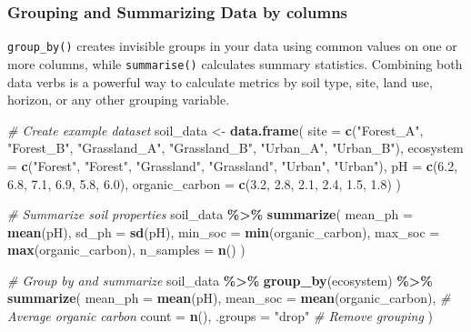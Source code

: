 \documentclass[
  10pt,
  b5paper,
  oneside]{book}
\newenvironment{Shaded}{\begin{snugshade}}{\end{snugshade}}
\newcommand{\AttributeTok}[1]{\textcolor[rgb]{0.13,0.29,0.53}{#1}}
\newcommand{\CommentTok}[1]{\textcolor[rgb]{0.56,0.35,0.01}{\textit{#1}}}
\newcommand{\FloatTok}[1]{\textcolor[rgb]{0.00,0.00,0.81}{#1}}
\newcommand{\FunctionTok}[1]{\textcolor[rgb]{0.13,0.29,0.53}{\textbf{#1}}}
\newcommand{\NormalTok}[1]{#1}
\newcommand{\OtherTok}[1]{\textcolor[rgb]{0.56,0.35,0.01}{#1}}
\newcommand{\SpecialCharTok}[1]{\textcolor[rgb]{0.81,0.36,0.00}{\textbf{#1}}}
\newcommand{\StringTok}[1]{\textcolor[rgb]{0.31,0.60,0.02}{#1}}
\begin{document}
\subsubsection{Grouping and Summarizing Data by columns}\label{dplyr-group}

\texttt{group\_by()} creates invisible groups in your data using common values on one or more columns, while \texttt{summarise()} calculates summary statistics.
Combining both data verbs is a powerful way to calculate metrics by soil type, site, land use, horizon, or any other grouping variable.

\begin{Shaded}
\begin{Highlighting}[]
\CommentTok{\# Create example dataset}
\NormalTok{soil\_data }\OtherTok{\textless{}{-}} \FunctionTok{data.frame}\NormalTok{(}
\AttributeTok{site =} \FunctionTok{c}\NormalTok{(}\StringTok{"Forest\_A"}\NormalTok{, }\StringTok{"Forest\_B"}\NormalTok{, }\StringTok{"Grassland\_A"}\NormalTok{, }\StringTok{"Grassland\_B"}\NormalTok{, }\StringTok{"Urban\_A"}\NormalTok{, }\StringTok{"Urban\_B"}\NormalTok{),}
\AttributeTok{ecosystem =} \FunctionTok{c}\NormalTok{(}\StringTok{"Forest"}\NormalTok{, }\StringTok{"Forest"}\NormalTok{, }\StringTok{"Grassland"}\NormalTok{, }\StringTok{"Grassland"}\NormalTok{, }\StringTok{"Urban"}\NormalTok{, }\StringTok{"Urban"}\NormalTok{),}
\AttributeTok{pH =} \FunctionTok{c}\NormalTok{(}\FloatTok{6.2}\NormalTok{, }\FloatTok{6.8}\NormalTok{, }\FloatTok{7.1}\NormalTok{, }\FloatTok{6.9}\NormalTok{, }\FloatTok{5.8}\NormalTok{, }\FloatTok{6.0}\NormalTok{),}
\AttributeTok{organic\_carbon =} \FunctionTok{c}\NormalTok{(}\FloatTok{3.2}\NormalTok{, }\FloatTok{2.8}\NormalTok{, }\FloatTok{2.1}\NormalTok{, }\FloatTok{2.4}\NormalTok{, }\FloatTok{1.5}\NormalTok{, }\FloatTok{1.8}\NormalTok{)}
\NormalTok{)}

\CommentTok{\# Summarize soil properties}
\NormalTok{soil\_data }\SpecialCharTok{\%\textgreater{}\%}
  \FunctionTok{summarize}\NormalTok{(}
    \AttributeTok{mean\_ph =} \FunctionTok{mean}\NormalTok{(pH),}
    \AttributeTok{sd\_ph =} \FunctionTok{sd}\NormalTok{(pH),}
    \AttributeTok{min\_soc =} \FunctionTok{min}\NormalTok{(organic\_carbon),}
    \AttributeTok{max\_soc =} \FunctionTok{max}\NormalTok{(organic\_carbon),}
    \AttributeTok{n\_samples =} \FunctionTok{n}\NormalTok{()}
\NormalTok{  )}

\CommentTok{\# Group by and summarize}
\NormalTok{soil\_data }\SpecialCharTok{\%\textgreater{}\%}
  \FunctionTok{group\_by}\NormalTok{(ecosystem) }\SpecialCharTok{\%\textgreater{}\%}
  \FunctionTok{summarize}\NormalTok{(}
    \AttributeTok{mean\_ph =} \FunctionTok{mean}\NormalTok{(pH),}
    \AttributeTok{mean\_soc =} \FunctionTok{mean}\NormalTok{(organic\_carbon), }\CommentTok{\# Average organic carbon}
    \AttributeTok{count =} \FunctionTok{n}\NormalTok{(),  }
  \AttributeTok{.groups =} \StringTok{"drop"}                   \CommentTok{\# Remove grouping}
\NormalTok{)}
\end{Highlighting}
\end{Shaded}
\end{document}
